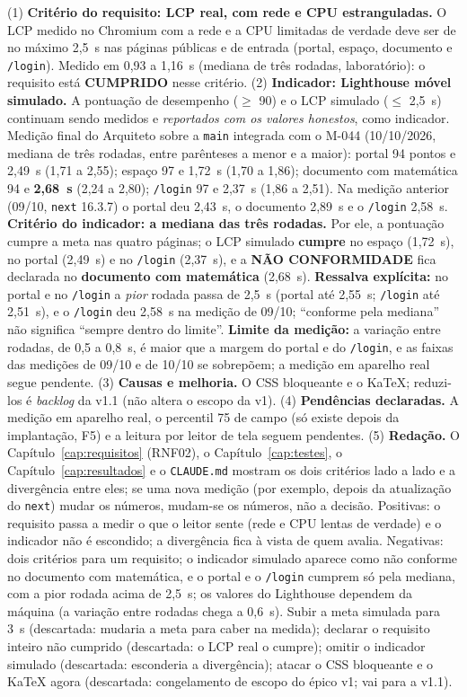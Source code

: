 {(1) \textbf{Critério do requisito: LCP real, com rede e CPU estranguladas.} O LCP medido no Chromium com a rede e a CPU limitadas de verdade deve ser de no máximo 2,5~s nas páginas públicas e de entrada (portal, espaço, documento e \texttt{/login}). Medido em 0,93 a 1,16~s (mediana de três rodadas, laboratório): o requisito está \textbf{CUMPRIDO} nesse critério. (2) \textbf{Indicador: Lighthouse móvel simulado.} A pontuação de desempenho ($\geq$ 90) e o LCP simulado ($\leq$ 2,5~s) continuam sendo medidos e \emph{reportados com os valores honestos}, como indicador. Medição final do Arquiteto sobre a \texttt{main} integrada com o M-044 (10/10/2026, mediana de três rodadas, entre parênteses a menor e a maior): portal 94 pontos e 2,49~s (1,71 a 2,55); espaço 97 e 1,72~s (1,70 a 1,86); documento com matemática 94 e \textbf{2,68~s} (2,24 a 2,80); \texttt{/login} 97 e 2,37~s (1,86 a 2,51). Na medição anterior (09/10, \texttt{next} 16.3.7) o portal deu 2,43~s, o documento 2,89~s e o \texttt{/login} 2,58~s. \textbf{Critério do indicador: a mediana das três rodadas.} Por ele, a pontuação cumpre a meta nas quatro páginas; o LCP simulado \textbf{cumpre} no espaço (1,72~s), no portal (2,49~s) e no \texttt{/login} (2,37~s), e a \textbf{NÃO CONFORMIDADE} fica declarada no \textbf{documento com matemática} (2,68~s). \textbf{Ressalva explícita:} no portal e no \texttt{/login} a \emph{pior} rodada passa de 2,5~s (portal até 2,55~s; \texttt{/login} até 2,51~s), e o \texttt{/login} deu 2,58~s na medição de 09/10; ``conforme pela mediana'' não significa ``sempre dentro do limite''. \textbf{Limite da medição:} a variação entre rodadas, de 0,5 a 0,8~s, é maior que a margem do portal e do \texttt{/login}, e as faixas das medições de 09/10 e de 10/10 se sobrepõem; a medição em aparelho real segue pendente. (3) \textbf{Causas e melhoria.} O CSS bloqueante e o KaTeX; reduzi-los é \emph{backlog} da v1.1 (não altera o escopo da v1). (4) \textbf{Pendências declaradas.} A medição em aparelho real, o percentil 75 de campo (só existe depois da implantação, F5) e a leitura por leitor de tela seguem pendentes. (5) \textbf{Redação.} O Capítulo~\ref{cap:requisitos} (RNF02), o Capítulo~\ref{cap:testes}, o Capítulo~\ref{cap:resultados} e o \texttt{CLAUDE.md} mostram os dois critérios lado a lado e a divergência entre eles; se uma nova medição (por exemplo, depois da atualização do \texttt{next}) mudar os números, mudam-se os números, não a decisão.}
{Positivas: o requisito passa a medir o que o leitor sente (rede e CPU lentas de verdade) e o indicador não é escondido; a divergência fica à vista de quem avalia. Negativas: dois critérios para um requisito; o indicador simulado aparece como não conforme no documento com matemática, e o portal e o \texttt{/login} cumprem só pela mediana, com a pior rodada acima de 2,5~s; os valores do Lighthouse dependem da máquina (a variação entre rodadas chega a 0,6~s).}
{Subir a meta simulada para 3~s (descartada: mudaria a meta para caber na medida); declarar o requisito inteiro não cumprido (descartada: o LCP real o cumpre); omitir o indicador simulado (descartada: esconderia a divergência); atacar o CSS bloqueante e o KaTeX agora (descartada: congelamento de escopo do épico v1; vai para a v1.1).}

